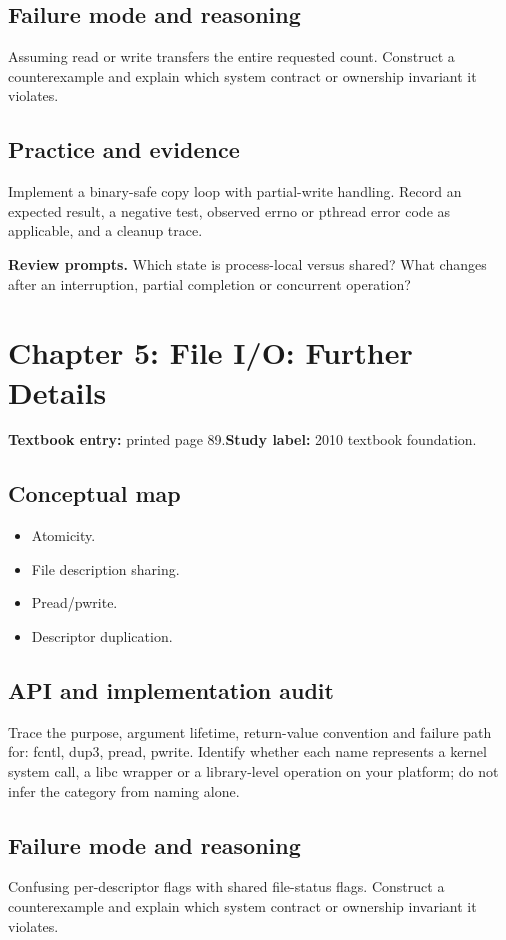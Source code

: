 \documentclass[11pt,letterpaper,oneside]{report}
\begin{document}
\subsection{Failure mode and reasoning}
Assuming read or write transfers the entire requested count. Construct a counterexample and explain which system contract or ownership invariant it violates.

\subsection{Practice and evidence}
Implement a binary-safe copy loop with partial-write handling. Record an expected result, a negative test, observed errno or pthread error code as applicable, and a cleanup trace.

\textbf{Review prompts.} Which state is process-local versus shared? What changes after an interruption, partial completion or concurrent operation?

\section{Chapter 5: File I/O: Further Details}
\textbf{Textbook entry:} printed page 89.\quad \textbf{Study label:} 2010 textbook foundation.

\subsection{Conceptual map}
\begin{itemize}
\item Atomicity.
\item File description sharing.
\item Pread/pwrite.
\item Descriptor duplication.
\end{itemize}
\subsection{API and implementation audit}
Trace the purpose, argument lifetime, return-value convention and failure path for: fcntl, dup3, pread, pwrite. Identify whether each name represents a kernel system call, a libc wrapper or a library-level operation on your platform; do not infer the category from naming alone.

\subsection{Failure mode and reasoning}
Confusing per-descriptor flags with shared file-status flags. Construct a counterexample and explain which system contract or ownership invariant it violates.
\end{document}

